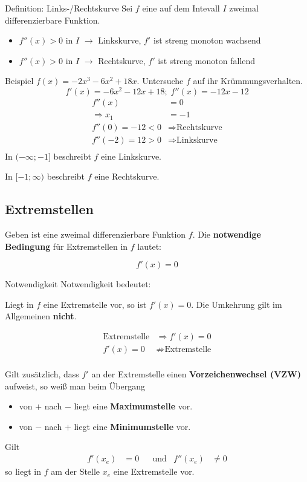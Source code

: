 \documentclass{article}
\begin{document}
\begin{boxx}[Red]{Definition: Links-/Rechtskurve}
    Sei $f$ eine auf dem Intevall $I$ zweimal differenzierbare Funktion.

    \begin{itemize}
        \item $f''(x)>0$ in $I$ $\rightarrow$ Linkskurve, $f'$ ist streng monoton wachsend
        \item $f''(x)>0$ in $I$ $\rightarrow$ Rechtskurve, $f'$ ist streng monoton fallend
    \end{itemize}
\end{boxx}
\newpage
\begin{boxx}[DarkBlue]{Beispiel}
    $\displaystyle f(x) = -2x^3 - 6x^2 + 18x$. 
    Untersuche $f$ auf ihr Krümmungsverhalten.
        \[f'(x) = -6x^2-12x+18;\; f''(x) = -12x-12\]
    \begin{align*}
        f''(x) &= 0 \\
        \Rightarrow x_1 &= -1\\
        f''(0) = -12 < 0 &\Rightarrow \text{Rechtskurve} \\
        f''(-2) = 12 > 0 &\Rightarrow \text{Linkskurve} \\
    \end{align*}
    In $\displaystyle (-\infty; -1]$ beschreibt $f$ eine Linkskurve.

    In $\displaystyle [-1; \infty)$ beschreibt $f$ eine Rechtskurve.
\end{boxx}

\subsection{Extremstellen}
Geben ist eine zweimal differenzierbare Funktion $f$. 
Die \textbf{notwendige Bedingung} für Extremstellen in $f$ lautet:

\[f'(x)=0\]

\begin{boxx}[LightYellow]{Notwendigkeit}
    Notwendigkeit bedeutet:

    Liegt in $f$ eine Extremstelle vor, so ist $f'(x) = 0$.
    Die Umkehrung gilt im Allgemeinen \textbf{nicht}.

    \begin{align*}
        \text{Extremstelle} &\Rightarrow f'(x) = 0 \\
        f'(x) = 0 &\not\Rightarrow \text{Extremstelle} \\
    \end{align*}
\end{boxx}
Gilt zusätzlich, dass $f'$ an der Extremstelle einen \textbf{Vorzeichenwechsel (VZW)} aufweist,
so weiß man beim Übergang
\begin{itemize}
    \item von $+$ nach $-$ liegt eine \textbf{Maximumstelle} vor.
    \item von $-$ nach $+$ liegt eine \textbf{Minimumstelle} vor.
\end{itemize}
Gilt
\begin{align*}
    &&&& f'\left(x_e\right) &= 0 &&\text{und} & f''\left(x_e\right) &\not = 0 &&&&
\end{align*}
so liegt in $f$ am der Stelle $x_e$ eine Extremstelle vor.
\end{document}

